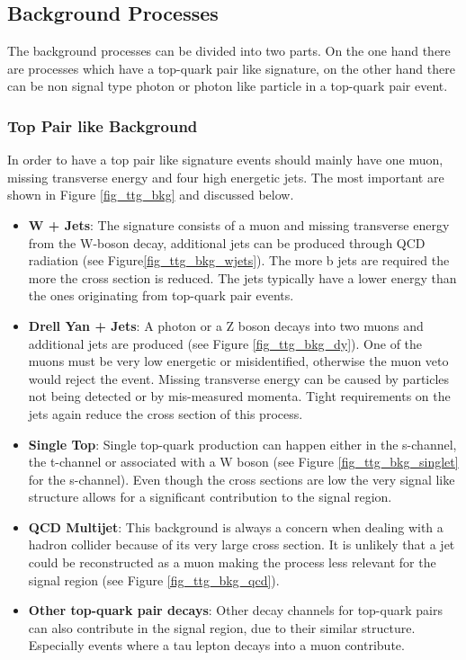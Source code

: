 \subsection{Background Processes}

The background processes can be divided into two parts. On the one hand there are processes which have a top-quark pair like signature, on the other hand there can be non signal type photon or photon like particle in a top-quark pair event.\\

\subsubsection{Top Pair like Background}

In order to have a top pair like signature events should mainly have one muon, missing transverse energy and four high energetic jets. The most important are shown in Figure \ref{fig_ttg_bkg} and discussed below.

\begin{itemize}
\item \textbf{W + Jets}: The signature consists of a muon and missing transverse energy from the W-boson decay, additional jets can be produced through QCD radiation (see Figure\ref{fig_ttg_bkg_wjets}). The more b jets are required the more the cross section is reduced. The jets typically have a lower energy than the ones originating from top-quark pair events.
\item \textbf{Drell Yan + Jets}: A photon or a Z boson decays into two muons and additional jets are produced (see Figure \ref{fig_ttg_bkg_dy}). One of the muons must be very low energetic or misidentified, otherwise the muon veto  would reject the event. Missing transverse energy can be caused by particles not being detected or by mis-measured momenta. Tight requirements on the jets again reduce the cross section of this process.
\item \textbf{Single Top}: Single top-quark production can happen either in the s-channel, the t-channel or associated with a W boson (see Figure \ref{fig_ttg_bkg_singlet} for the s-channel). Even though the cross sections are low  the very signal like structure allows for a significant contribution to the signal region.
\item \textbf{QCD Multijet}: This background is always a concern when dealing with a hadron collider because of its very large cross section. It is unlikely that a jet could be reconstructed as a muon making the process less relevant for the signal region (see Figure \ref{fig_ttg_bkg_qcd}).
\item \textbf{Other top-quark pair decays}: Other decay channels for top-quark pairs can also contribute in the signal region, due to their similar structure. Especially events where a tau lepton decays into a muon contribute. 
\end{itemize}

